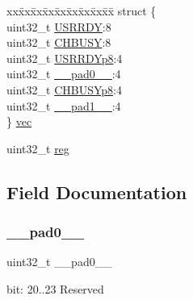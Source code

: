 \begin{DoxyCompactItemize}
\begin{tabbing}
\end{tabbing}\item 
\begin{tabbing}
xx\=xx\=xx\=xx\=xx\=xx\=xx\=xx\=xx\=\kill
struct \{\\
\>uint32\_t \mbox{\hyperlink{union_e_v_s_y_s___c_h_s_t_a_t_u_s___type_ab3f6eb8bdfd1fda4c86482f9eaf8c1bf}{USRRDY}}:8\\
\>uint32\_t \mbox{\hyperlink{union_e_v_s_y_s___c_h_s_t_a_t_u_s___type_a863350e3d7203dac77eeb2612a18401d}{CHBUSY}}:8\\
\>uint32\_t \mbox{\hyperlink{union_e_v_s_y_s___c_h_s_t_a_t_u_s___type_a552cc0ab3525041d670d8bffa696abb8}{USRRDYp8}}:4\\
\>uint32\_t \mbox{\hyperlink{union_e_v_s_y_s___c_h_s_t_a_t_u_s___type_a3e57c2ef1c3ffb36722f000cc1156824}{\_\_pad0\_\_}}:4\\
\>uint32\_t \mbox{\hyperlink{union_e_v_s_y_s___c_h_s_t_a_t_u_s___type_a182a339e473ac3dabb70d8ef837112b7}{CHBUSYp8}}:4\\
\>uint32\_t \mbox{\hyperlink{union_e_v_s_y_s___c_h_s_t_a_t_u_s___type_a6712ba6dd1d5b43d2d56ff8ac4e275a7}{\_\_pad1\_\_}}:4\\
\} \mbox{\hyperlink{union_e_v_s_y_s___c_h_s_t_a_t_u_s___type_a0ce84c7e3b559466f40150ad84243ef0}{vec}}\\

\end{tabbing}\item 
uint32\+\_\+t \mbox{\hyperlink{union_e_v_s_y_s___c_h_s_t_a_t_u_s___type_a6b91636401516a477989a336376d7b40}{reg}}
\end{DoxyCompactItemize}


\subsection{Field Documentation}
\mbox{\label{union_e_v_s_y_s___c_h_s_t_a_t_u_s___type_a3e57c2ef1c3ffb36722f000cc1156824}} 
\subsubsection{\texorpdfstring{\_\_pad0\_\_}{\_\_pad0\_\_}}
{\footnotesize\ttfamily uint32\+\_\+t \+\_\+\+\_\+pad0\+\_\+\+\_\+}

bit\+: 20..23 Reserved \mbox{\label{union_e_v_s_y_s___c_h_s_t_a_t_u_s___type_a6712ba6dd1d5b43d2d56ff8ac4e275a7}} 
